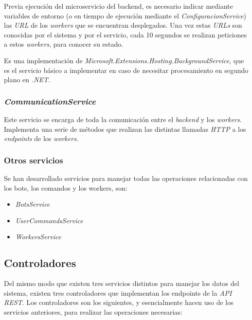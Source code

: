 Previa ejecución del microservicio del backend, es necesario indicar mediante variables de entorno (o en tiempo de ejecución mediante el \textit{ConfiguracionService}) las \textit{URL} de los \textit{workers} que se encuentran desplegados. Una vez estas \textit{URLs} son conocidas por el sistema y por el servicio, cada 10 segundos se realizan peticiones a estos \textit{workers}, para conocer su estado.

Es una implementación de \textit{Microsoft.Extensions.Hosting.BackgroundService}, que es el servicio básico a implementar en caso de necesitar procesamiento en segundo plano en \textit{.NET}.

\subsubsection{\textit{CommunicationService}}

Este servicio se encarga de toda la comunicación entre el \textit{backend} y los \textit{workers}. Implementa una serie de métodos que realizan las distintas llamadas \textit{HTTP} a los \textit{endpoints} de los \textit{workers}.

\subsubsection{Otros servicios}

Se han desarrollado servicios para manejar todas las operaciones relacionadas con los bots, los comandos y los workers, son:

\begin{itemize}
	\item \textit{BotsService}
	\item \textit{UserCommandsService} 
	\item \textit{WorkersService} 
\end{itemize}

\subsection{Controladores}

Del mismo modo que existen tres servicios distintos para manejar los datos del sistema, existen tres controladores que implementan los endpoints de la \textit{API REST}. Los controladores son los siguientes, y esencialmente hacen uso de los servicios anteriores, para realizar las operaciones necesarias:

